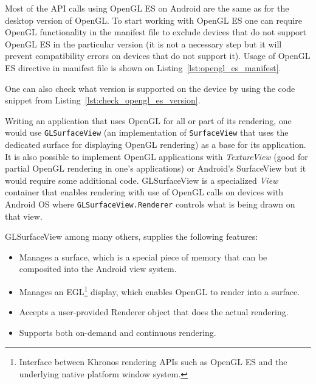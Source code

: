 
Most of the API calls using OpenGL ES on Android are the same as for the desktop version of OpenGL. 
To start working with OpenGL ES one can require OpenGL functionality in the manifest file to exclude devices that do not support OpenGL ES in the particular version (it is not a necessary step but it will prevent compatibility errors on devices that do not support it).
Usage of OpenGL ES directive in manifest file is shown on Listing~\ref{lst:opengl_es_manifest}.



%  

One can also check what version is supported on the device by using the code snippet from Listing~\ref{lst:check_opengl_es_version}.
\begin{filecode}[label=lst:check_opengl_es_version,caption=Checking OpenGL ES version support on the device.]
  
\end{filecode}

%

Writing an application that uses OpenGL for all or part of its rendering, one would use \texttt{GLSurfaceView} (an implementation of \texttt{SurfaceView} that uses the dedicated surface for displaying OpenGL rendering) \cite{android_glsurfaceview} as a base for its application.
It is also possible to implement OpenGL applications with \emph{TextureView} (good for partial OpenGL rendering in one's applications) or Android's SurfaceView but it would require some additional code.
\newline GLSurfaceView is a specialized \emph{View} container that enables rendering with use of OpenGL calls on devices with Android OS where \texttt{GLSurfaceView.Renderer} controls what is being drawn on that view.

GLSurfaceView among many others, supplies the following features:
\begin{itemize}
\item Manages a surface, which is a special piece of memory that can be composited into the Android view system.
\item Manages an EGL\footnote{Interface between Khronos rendering APIs such as OpenGL ES and the underlying native platform window system.} display, which enables OpenGL to render into a surface.
\item Accepts a user-provided Renderer object that does the actual rendering.
\item Supports both on-demand and continuous rendering.
\end{itemize}

